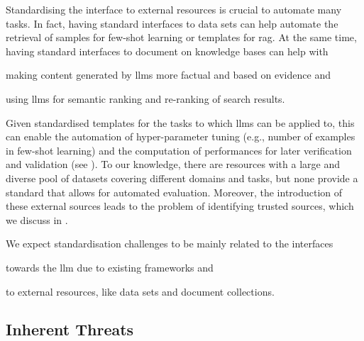 \documentclass[manuscript,screen]{acmart}
\begin{document}

Standardising the interface to external resources is crucial to automate many tasks.
In fact, having standard interfaces to data sets can help automate the retrieval of samples for few-shot learning or templates for \ac{rag}.
At the same time, having standard interfaces to document on knowledge bases can help with
\begin{enumerate*}[label=(\roman*)]
  \item making content generated by \acp{llm} more factual and based on evidence and
  \item using \acp{llm} for semantic ranking and re-ranking of search results.
\end{enumerate*}
Given standardised templates for the tasks to which \acp{llm} can be applied to, this can enable the automation of hyper-parameter tuning (e.g., number of examples in few-shot learning) and the computation of performances for later verification and validation (see ).
To our knowledge, there are resources with a large and diverse pool of datasets covering different domains and tasks, but none provide a standard that allows for automated evaluation.
Moreover, the introduction of these external sources leads to the problem of identifying trusted sources, which we discuss in .

\begin{tcolorbox}[
    title=Standardisation, %
    left=1mm,
    right=1mm,
    top=1mm,
    bottom=1mm,
    fonttitle=\bfseries, %
    boxrule=0.5pt, %
    arc=5pt, %
    width=\columnwidth %
]
We expect standardisation challenges to be mainly related to the interfaces
\begin{enumerate*}[label=(\roman*)]
    \item towards the \ac{llm} due to existing frameworks and
    \item to external resources, like data sets and document collections.
\end{enumerate*}
\end{tcolorbox}

\subsection{Inherent Threats}
\label{sec:remainingthreats}

\end{document}
